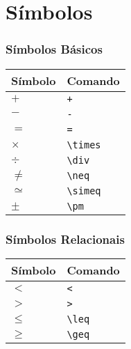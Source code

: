 \documentclass[brazilian]{beamer}
\begin{document}
\section{Símbolos}
\begin{frame}[fragile]
    \frametitle{Símbolos Básicos}

    \begin{table}
        \begin{tabular}{O{1.5cm}l}
            Símbolo & Comando \\ \hline
            \(+\) & \lstinline[style=myStyleLatex]!+! \\ \hline
            \(-\) & \lstinline[style=myStyleLatex]!-! \\ \hline
            \(=\) & \lstinline[style=myStyleLatex]!=! \\ \hline
            \(\times \) & \lstinline[style=myStyleLatex]!\times ! \\ \hline
            \(\div \) & \lstinline[style=myStyleLatex]!\div ! \\ \hline
            \(\neq \) & \lstinline[style=myStyleLatex]!\neq ! \\ \hline
            \(\simeq \) & \lstinline[style=myStyleLatex]!\simeq ! \\ \hline
            \(\pm \) & \lstinline[style=myStyleLatex]!\pm ! \\ \hline
        \end{tabular}
    \end{table}

\end{frame}

\begin{frame}[fragile]
    \frametitle{Símbolos Relacionais}

    \begin{table}
        \begin{tabular}{O{1.5cm}l}
            Símbolo & Comando \\ \hline
            \(<\) & \lstinline[style=myStyleLatex]!<! \\ \hline
            \(>\) & \lstinline[style=myStyleLatex]!>! \\ \hline
            \(\leq\) & \lstinline[style=myStyleLatex]!\leq! \\ \hline
            \(\geq \) & \lstinline[style=myStyleLatex]!\geq! \\ \hline
        \end{tabular}
    \end{table}

\end{frame}
\end{document}
